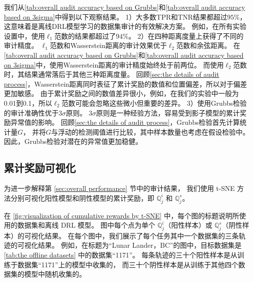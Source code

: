 我们从\autoref{tab:overall audit accuracy based on Grubbs}和\autoref{tab:overall audit accuracy based on 3sigma}中得到以下观察结果。
1）大多数TPR和TNR结果都超过$95\%$，这意味着\sysnameo 是离线DRL模型学习的数据集审计的有效解决方案。
例如，在所有实验设置中，\sysnameo 使用$\ell_1$范数的结果都超过了$94\%$。
2）\sysnameo 在四种距离度量上获得了不同的审计精度。
$\ell_1$范数和Wasserstein距离的审计效果优于$\ell_2$范数和余弦距离。
在\autoref{tab:overall audit accuracy based on Grubbs}和\autoref{tab:overall audit accuracy based on 3sigma}中，使用Wasserstein距离的\sysnameo 审计精度始终处于前两位。
而使用$\ell_2$范数时，其结果通常落后于其他三种距离度量。
回顾\autoref{sec:the details of audit process}，Wasserstein距离同时表征了累计奖励的数值和位置偏差，所以对于偏差更加敏感。
由于累计奖励之间的数值差异很小，例如，在我们的实验中一般为0.01到0.1，所以$\ell_2$范数可能会忽略这些微小但重要的差异。
3）使用Grubbs检验的审计准确性优于3$\sigma$原则。
3$\sigma$原则是一种经验方法，容易受到影子模型的累计奖励异常值的影响。
回顾\autoref{sec:the details of audit process}，Grubbs检验首先计算统计量$G$，
并将$G$与浮动的检测阈值进行比较，其中样本数量也考虑在假设检验中。
因此，Grubbs检验对潜在的异常值更加稳健。

\subsection{累计奖励可视化}
\label{sec:visualization of cumulative rewards}

为进一步解释第 \ref{sec:overall performance} 节中的审计结果，
我们使用 t-SNE 方法分别可视化阳性模型和阴性模型的累计奖励，即 $\mathbb{Q}_j^i$ 和 $\mathbb{Q}_j^s$。

在 \autoref{fig:visualization of cumulative rewards by t-SNE} 中，每个图的标题说明所使用的数据集和离线 DRL 模型。
图中每个点为单个 $\mathbb{Q}_j^i$（阳性样本）或 $\mathbb{Q}_j^s$（阴性样本）的可视化结果。
在每个图中，我们展示了每个任务其中一个数据集的三条轨迹的可视化结果。
例如，在标题为“Lunar Lander，BC”的图中，目标数据集是 \autoref{tab:the offline datasets} 中的数据集“1171”。
每条轨迹的三十个阳性样本是从训练于数据集“1171”上的模型中收集的，
而三十个阴性样本是从训练于其他四个数据集的模型中随机收集的。

